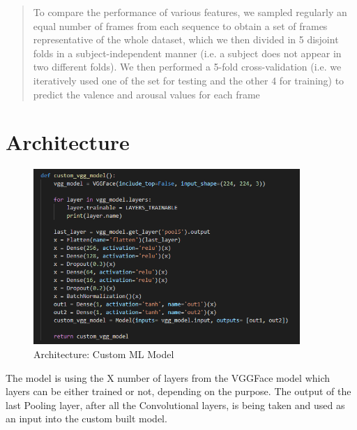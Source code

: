 \begin{quote}
    To compare the performance of various features, we sampled regularly an equal number of frames from each sequence to obtain a set of frames representative of the whole dataset, which we then divided in 5 disjoint folds in a subject-independent manner (i.e. a subject does not appear in two different folds). We then performed a 5-fold cross-validation (i.e. we iteratively used one of the set for testing and the other 4 for training) to predict the valence and arousal values for each frame\cite{Kossaifi:2017:AFEW-VADatabase}
\end{quote}

\section{Architecture}

\begin{figure}[H]
  \begin{center}
  \includegraphics[angle=0, width=0.9\textwidth]{Figures/model_architecture.PNG}
  \caption{Architecture: Custom ML Model}
  \label{fig:ArchitectureCustomMLModel}
  \end{center}
\end{figure}

The model is using the X number of layers from the VGGFace model which layers can be either trained or not, depending on the purpose. The output of the last Pooling layer, after all the Convolutional layers, is being taken and used as an input into the custom built model.

